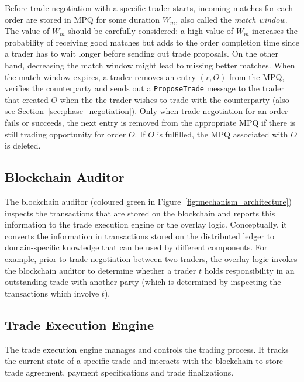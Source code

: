 Before trade negotiation with a specific trader starts, incoming matches for each order are stored in MPQ for some duration $ W_m $, also called the \emph{match window}.
The value of $ W_m $ should be carefully considered: a high value of $ W_m $ increases the probability of receiving good matches but adds to the order completion time since a trader has to wait longer before sending out trade proposals.
On the other hand, decreasing the match window might lead to missing better matches.
When the match window expires, a trader removes an entry $ (r, O) $ from the MPQ, verifies the counterparty and sends out a \texttt{ProposeTrade} message to the trader that created $ O $ when the the trader wishes to trade with the counterparty (also see Section~\ref{sec:phase_negotiation}).
Only when trade negotiation for an order fails or succeeds, the next entry is removed from the appropriate MPQ if there is still trading opportunity for order $ O $.
If $ O $ is fulfilled, the MPQ associated with $ O $ is deleted.

\subsection{Blockchain Auditor}
\label{subsec:ledger_auditor}
The blockchain auditor (coloured green in Figure~\ref{fig:mechanism_architecture}) inspects the transactions that are stored on the \ModelName{} blockchain and reports this information to the trade execution engine or the overlay logic.
Conceptually, it converts the information in transactions stored on the distributed ledger to domain-specific knowledge that can be used by different components.
For example, prior to trade negotiation between two traders, the overlay logic invokes the blockchain auditor to determine whether a trader $ t $ holds responsibility in an outstanding trade with another party (which is determined by inspecting the transactions which involve $ t $).

\subsection{Trade Execution Engine}
\label{subsec:trade_execution_engine}
The trade execution engine manages and controls the trading process.
It tracks the current state of a specific trade and interacts with the \ModelName{} blockchain to store trade agreement, payment specifications and trade finalizations.

